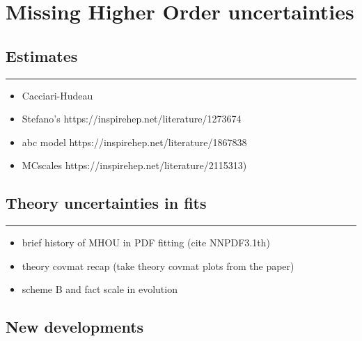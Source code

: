 
\chapter{Missing Higher Order uncertainties}
\label{ch:mhou}
\minitoc
\adjustmtc



\section{Estimates}
\label{sec:mhou/estimates}


\vspace*{20pt}
\noindent
\rule{\hsize}{1pt}

\begin{itemize}
	\item Cacciari-Hudeau
	\item  Stefano's https://inspirehep.net/literature/1273674
	\item abc model https://inspirehep.net/literature/1867838
	\item MCscales https://inspirehep.net/literature/2115313)
\end{itemize} 

\section{Theory uncertainties in \pdf fits}
\label{sec:mhou/pdf}


\vspace*{20pt}
\noindent
\rule{\hsize}{1pt}

\begin{itemize}
	\item brief history of MHOU in PDF fitting (cite NNPDF3.1th)
	\item theory covmat recap (take theory covmat plots from the paper)
	\item scheme B and fact scale in evolution
\end{itemize}

\section{New developments}
\label{sec:mhou/new}


